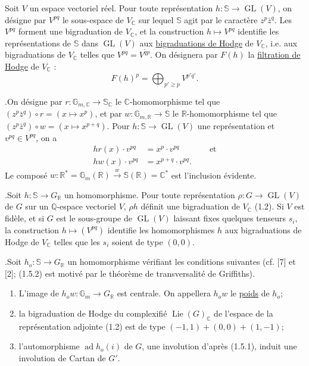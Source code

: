 \documentclass[10pt]{article}
\newcommand{\C}{\mathbb C}
\newcommand{\Gm}{\mathbb G_m}
\newcommand{\Q}{\mathbb Q}
\newcommand{\R}{\mathbb R}
\newcommand{\bS}{\mathbb S}
\newcommand{\GL}{\operatorname{GL}}
\newcommand{\Lie}{\operatorname{Lie}}
\newcommand{\ad}{\operatorname{ad}}
\begin{document}
Soit $V$ un espace vectoriel réel. Pour toute représentation $h:\bS\to\GL(V)$, on désigne par $V^{pq}$ le sous-espace de $V_\C$ sur lequel $\bS$ agit par le caractère $z^p\bar z^q$. Les $V^{pq}$ forment une bigraduation de $V_\C$, et la construction $h\mapsto V^{pq}$ identifie les représentations de $\bS$ dans $\GL(V)$ aux \uline{bigraduations de Hodge} de $V_\C$, i.e. aux bigraduations de $V_\C$ telles que $V^{pq}=\overline{V^{qp}}$. On désignera par $F(h)$ la \uline{filtration de Hodge} de $V_\C$ :
\[
F(h)^p=\bigoplus_{p'\ge p}V^{p'q'}.
\]

.\quad On désigne par $r:\mathbb G_{m,\C}\to\bS_\C$ le $\C$-homomorphisme tel que $(z^p\bar z^q)\circ r=(x\longmapsto x^p)$, et par $w:\mathbb G_{m,\R}\to\bS$ le $\R$-homomorphisme tel que $(z^p\bar z^q)\circ w=(x\longmapsto x^{p+q})$. Pour $h:\bS\to\GL(V)$ une représentation et $v^{pq}\in V^{pq}$, on a
\[
\begin{aligned}
hr(x)\cdot v^{pq}&=x^p\cdot v^{pq}\qquad &&\text{et}\\
hw(x)\cdot v^{pq}&=x^{p+q}\cdot v^{pq}.
\end{aligned}
\]
Le composé $w:\R^*=\mathbb G_m(\R)\xrightarrow{w}\bS(\R)=\C^*$ est l'inclusion évidente.

.\quad Soit $h:\bS\to G_\R$ un homomorphisme. Pour toute représentation $\rho:G\to\GL(V)$ de $G$ sur un $\Q$-espace vectoriel $V$, $\rho h$ définit une bigraduation de $V_\C$ (1.2). Si $V$ est fidèle, et si $G$ est le sous-groupe de $\GL(V)$ laissant fixes quelques tenseurs $s_i$, la construction $h\mapsto(V^{pq})$ identifie les homomorphismes $h$ aux bigraduations de Hodge de $V_\C$ telles que les $s_i$ soient de type $(0,0)$.

.\quad Soit $h_o:\bS\to G_\R$ un homomorphisme vérifiant les conditions suivantes (cf. [7] et [2]; (1.5.2) est motivé par le théorème de transversalité de Griffiths).

\begin{enumerate}[label={(1.5.\arabic*)},leftmargin=3.0em]
\item L'image de $h_ow:\Gm\to G_\R$ est centrale. On appellera $h_ow$ le \uline{poids} de $h_o$;
\item la bigraduation de Hodge du complexifié $\Lie(G)_\C$ de l'espace de la représentation adjointe (1.2) est de type $(-1,1)+(0,0)+(1,-1)$;
\item l'automorphisme $\ad h_o(i)$ de $G$, une involution d'après (1.5.1), induit une involution de Cartan de $G'$.
\end{enumerate}
\end{document}
